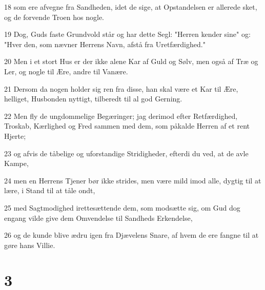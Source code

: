 \par 18 som ere afvegne fra Sandheden, idet de sige, at Opstandelsen er allerede sket, og de forvende Troen hos nogle.
\par 19 Dog, Guds faste Grundvold står og har dette Segl: "Herren kender sine" og: "Hver den, som nævner Herrens Navn, afstå fra Uretfærdighed."
\par 20 Men i et stort Hus er der ikke alene Kar af Guld og Sølv, men også af Træ og Ler, og nogle til Ære, andre til Vanære.
\par 21 Dersom da nogen holder sig ren fra disse, han skal være et Kar til Ære, helliget, Husbonden nyttigt, tilberedt til al god Gerning.
\par 22 Men fly de ungdommelige Begæringer; jag derimod efter Retfærdighed, Troskab, Kærlighed og Fred sammen med dem, som påkalde Herren af et rent Hjerte;
\par 23 og afvis de tåbelige og uforstandige Stridigheder, efterdi du ved, at de avle Kampe,
\par 24 men en Herrens Tjener bør ikke strides, men være mild imod alle, dygtig til at lære, i Stand til at tåle ondt,
\par 25 med Sagtmodighed irettesættende dem, som modsætte sig, om Gud dog engang vilde give dem Omvendelse til Sandheds Erkendelse,
\par 26 og de kunde blive ædru igen fra Djævelens Snare, af hvem de ere fangne til at gøre hans Villie.

\chapter{3}

